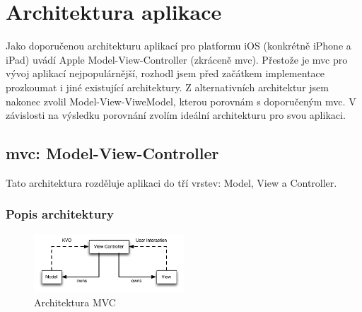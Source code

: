 \section{Architektura aplikace}\label{analyza-architektura}

Jako doporučenou architekturu aplikací pro platformu iOS (konkrétně iPhone a iPad) uvádí Apple Model-View-Controller (zkráceně \acrshort{mvc}).
Přestože je \acrshort{mvc} pro vývoj aplikací nejpopulárnější, rozhodl jsem před začátkem implementace prozkoumat i jiné existující architektury.
Z alternativních architektur jsem nakonec zvolil Model-View-ViweModel, kterou porovnám s doporučeným \acrshort{mvc}.
V závislosti na výsledku porovnání zvolím ideální architekturu pro svou aplikaci.

\subsection{\acrshort{mvc}: Model-View-Controller}\label{analyza-mvc}
Tato architektura rozděluje aplikaci do tří vrstev: Model, View a Controller.

\subsubsection*{Popis architektury}

\begin{figure}\centering
	\includegraphics[width=0.5\textwidth]{assets/mvc-architecture.png}
	\caption{Architektura MVC}\label{fig:architektura-mvc}
\end{figure}

